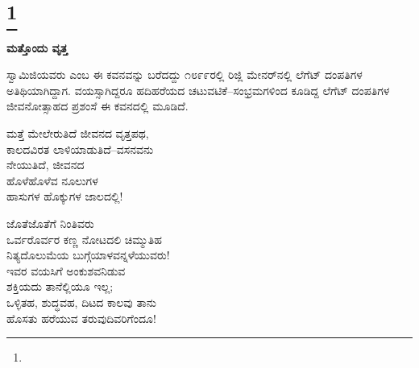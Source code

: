 \selecteng

\chapter[ONE MORE CIRCLE]{\protect\footnote{}}

\begin{myquote}
\end{myquote}

\begin{myquote}
\end{myquote}

\begin{myquote}
\end{myquote}

\selectkan

\begin{center}
\textbf{ಮತ್ತೊಂದು ವೃತ್ತ}
\end{center}

ಸ್ವಾಮಿಜಿಯವರು  ಎಂಬ ಈ ಕವನವನ್ನು ಬರೆದದ್ದು ೧೮೯೯ರಲ್ಲಿ ರಿಜ್ಲಿ ಮೇನರ್‌ನಲ್ಲಿ ಲೆಗೆಟ್ ದಂಪತಿಗಳ ಅತಿಥಿಯಾಗಿದ್ದಾಗ. ವಯಸ್ಸಾಗಿದ್ದರೂ ಹದಿಹರೆಯದ ಚಟುವಟಿಕೆ–ಸಂಭ್ರಮಗಳಿಂದ ಕೂಡಿದ್ದ ಲೆಗೆಟ್ ದಂಪತಿಗಳ ಜೀವನೋತ್ಸಾಹದ ಪ್ರಶಂಸೆ ಈ ಕವನದಲ್ಲಿ ಮೂಡಿದೆ.

\begin{myquote}
ಮತ್ತೆ ಮೇಲೇರುತಿದೆ ಜೀವನದ ವೃತ್ತಪಥ,\\ಕಾಲದವಿರತ ಲಾಳಿಯಾಡುತಿದೆ–ವಸನವನು\\ನೇಯುತಿದೆ, ಜೀವನದ\\ಹೊಳೆಹೊಳೆವ ನೂಲುಗಳ\\ಹಾಸುಗಳ ಹೊಕ್ಕುಗಳ ಜಾಲದಲ್ಲಿ!
\end{myquote}

\begin{myquote}
ಜೊತೆಜೊತೆಗೆ ನಿಂತಿವರು\\ಒರ್ವರೊರ್ವರ ಕಣ್ಣ ನೋಟದಲಿ ಚಿಮ್ಮುತಿಹ\\ನಿತ್ಯದೊಲುಮೆಯ ಬುಗ್ಗೆಯಾಳವನ್ನಳೆಯುವರು!\\ಇವರ ವಯಸಿಗೆ ಅಂಕುಶವನಿಡುವ\\ಶಕ್ತಿಯದು ತಾನೆಲ್ಲಿಯೂ ಇಲ್ಲ;\\ಒಳ್ಳಿತಹ, ಶುದ್ಧವಹ, ದಿಟದ ಕಾಲವು ತಾನು\\ಹೊಸತು ಹರೆಯುವ ತರುವುದಿವರಿಗೆಂದೂ!
\end{myquote}

